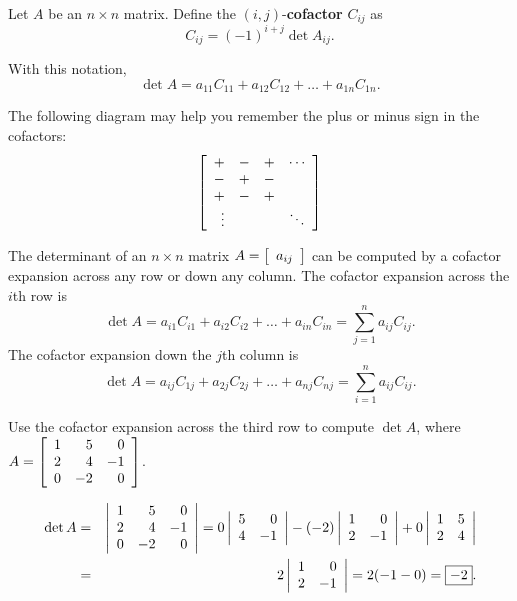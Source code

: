 \begin{Def}  Let $A$ be an $n\times n$ matrix. Define the $(i,j)$-\textbf{cofactor} $C_{ij}$ as 
\[C_{ij} = (-1)^{i+j}\det A_{ij}.\]
\end{Def}\vs

With this notation, 
\[\det A = a_{11}C_{11} + a_{12}C_{12} + \ldots + a_{1n}C_{1n}.\]\vs

The following diagram may help you remember the plus or minus sign in the cofactors:
\[\mtx{rrrr}{+ & -& + & \cdots \\ - & + & -&  \\ + & -& + &  \\ \vdots & & &\ddots}\]\vs

\begin{Thm} The determinant of an $n\times n$ matrix $A = \mtx{c}{a_{ij}}$ can be computed by a cofactor expansion across any row or down any column. The cofactor expansion across the $i$th row is 
\[\det A = a_{i1}C_{i1} + a_{i2}C_{i2} + \ldots + a_{in}C_{in} = \sum_{j=1}^n a_{ij}C_{ij}.\] The cofactor expansion down the $j$th column is
\[\det A = a_{ij}C_{1j} + a_{2j}C_{2j} + \ldots + a_{nj}C_{nj} = \sum_{i=1}^n a_{ij}C_{ij}.\]
\end{Thm}\vs

\begin{Exam} Use the cofactor expansion across the third row to compute $\det A$, where $A = \mtx{rrr}{1&5&0\\2&4&-1\\0&-2&0}$.

\begin{eqnarray*}
\det A &=& \dtx{rrr}{1&5&0\\2&4&-1\\0&-2&0} = 0\dtx{rr}{5&0\\4&-1} - (-2)\dtx{rr}{1&0\\2&-1} + 0\dtx{rr}{1&5\\2&4}\\
&=& 2\dtx{rr}{1&0\\2&-1} = 2(-1-0) = \fbox{$-2$}.
\end{eqnarray*}
\end{Exam}

